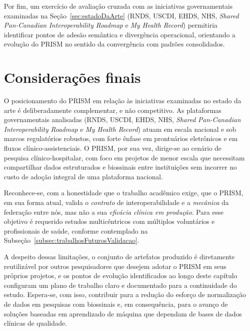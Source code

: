 Por fim, um exercício de avaliação cruzada com as iniciativas governamentais examinadas na Seção~\ref{sec:estadoDaArte} (RNDS, USCDI, EHDS, NHS, \textit{Shared Pan-Canadian Interoperability Roadmap} e \textit{My Health Record}) permitiria identificar pontos de adesão semântica e divergência operacional, orientando a evolução do PRISM no sentido da convergência com padrões consolidados.

\section{Considerações finais}\label{sec:fechamento}

O posicionamento do PRISM em relação às iniciativas examinadas no estado da arte é deliberadamente complementar, e não competitivo. As plataformas governamentais analisadas (RNDS, USCDI, EHDS, NHS, \textit{Shared Pan-Canadian Interoperability Roadmap} e \textit{My Health Record}) atuam em escala nacional e sob marcos regulatórios robustos, com forte ênfase em prontuários eletrônicos e em fluxos clínico-assistenciais. O PRISM, por sua vez, dirige-se ao cenário de pesquisa clínico-hospitalar, com foco em projetos de menor escala que necessitam compartilhar dados estruturados e biossinais entre instituições sem incorrer no custo de adoção integral de uma plataforma nacional.

Reconhece-se, com a honestidade que o trabalho acadêmico exige, que o PRISM, em sua forma atual, valida o \textit{contrato} de interoperabilidade e a \textit{mecânica} da federação entre nós, mas não a sua \textit{eficácia clínica em produção}. Para esse objetivo é requerido estudos multicêntricos com múltiplos voluntários e profissionais de saúde, conforme contemplado na Subseção~\ref{subsec:trabalhosFuturosValidacao}.

A despeito dessas limitações, o conjunto de artefatos produzido é diretamente reutilizável por outros pesquisadores que desejem adotar o PRISM em seus próprios projetos, e os pontos de evolução identificados ao longo deste capítulo configuram um plano de trabalho claro e documentado para a continuidade do estudo. Espera-se, com isso, contribuir para a redução do esforço de normalização de dados em pesquisas com biossinais e, em consequência, para o avanço de soluções baseadas em aprendizado de máquina que dependam de bases de dados clínicas de qualidade.
